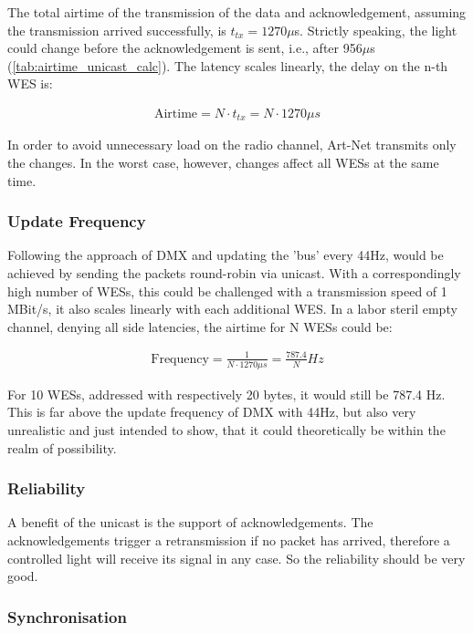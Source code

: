 The total airtime of the transmission of the data and acknowledgement, 
assuming the transmission arrived successfully, is $t_{tx}=1270\mu$s.
Strictly speaking, the light could change before the acknowledgement is sent, 
i.e., after 956$\mu$s (\cref{tab:airtime_unicast_calc}).
The latency scales linearly, the delay on the n-th WES is:

\begin{align}
	\text{Airtime} = N \cdot t_{tx} = N \cdot 1270\mu s
\end{align}

In order to avoid unnecessary load on the radio channel, Art-Net transmits only the changes.
In the worst case, however, changes affect all WESs at the same time.

\subsubsection*{Update Frequency}
Following the approach of DMX and updating the 'bus' every 44Hz,
would be achieved by sending the packets round-robin via unicast. 
With a correspondingly high number of WESs, this could be challenged with a transmission speed of 1 MBit/s, 
it also scales linearly with each additional WES. 
In a labor steril empty channel, denying all side latencies, the airtime for N WESs could be:

\begin{align}
	\text{Frequency} = \frac{1}{N \cdot 1270\mu s} = \frac{787.4}{N} Hz
\end{align}

For 10 WESs, addressed with respectively 20 bytes, it would still be 787.4 Hz.
This is far above the update frequency of DMX with 44Hz, but also very unrealistic and just intended to show,
that it could theoretically be within the realm of possibility.

\subsubsection*{Reliability}

A benefit of the unicast is the support of acknowledgements. 
The acknowledgements trigger a retransmission if no packet has arrived, therefore a controlled light will receive its signal in any case.
So the reliability should be very good.

\subsubsection*{Synchronisation}

